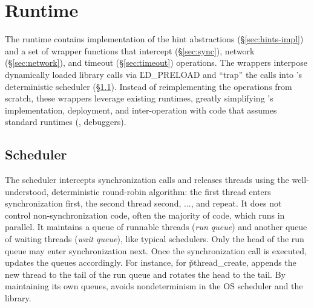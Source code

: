 \section{\parrot Runtime} \label{sec:runtime}


The \parrot runtime contains implementation of the hint abstractions
(\S\ref{sec:hints-impl}) and a set of wrapper functions that intercept
\pthread (\S\ref{sec:sync}), network (\S\ref{sec:network}), and timeout
(\S\ref{sec:timeout}) operations.  The wrappers interpose dynamically
loaded library calls via \v{LD\_PRELOAD} and ``trap'' the calls into
\parrot's deterministic scheduler (\S\ref{sec:scheduler}).  Instead of
reimplementing the operations from scratch, these wrappers leverage
existing runtimes, greatly simplifying \parrot's implementation, deployment,
and inter-operation with code that assumes standard runtimes (\eg,
debuggers).

\subsection{Scheduler} \label{sec:scheduler}

The scheduler intercepts synchronization calls and releases threads using the
well-understood, deterministic round-robin algorithm: the first thread
enters synchronization first, the second thread second, ..., and
repeat.  It does not control non-synchronization code, often the majority
of code, which runs in parallel.  It maintains a queue
of runnable threads (\emph{run queue}) and another queue of waiting
threads (\emph{wait queue}), like typical schedulers.  Only the head of the
run queue may enter synchronization next. Once the synchronization call is
executed, \parrot updates the queues accordingly.  For instance, for
\v{pthread\_create}, \parrot appends the new thread to the tail of
the run queue and rotates the head to the tail.  By maintaining
its own queues, \parrot avoids nondeterminism in the OS scheduler and
the \pthread library.

